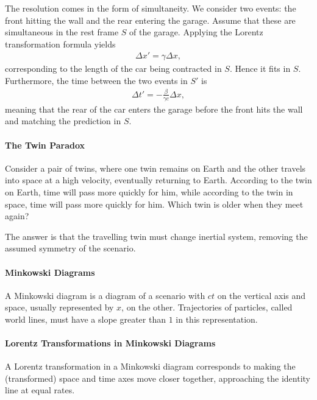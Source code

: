 The resolution comes in the form of simultaneity. We consider two events: the front hitting the wall and the rear entering the garage. Assume that these are simultaneous in the rest frame $S$ of the garage. Applying the Lorentz transformation formula yields
\begin{align*}
	\Delta x' = \gamma\Delta x,
\end{align*}
corresponding to the length of the car being contracted in $S$. Hence it fits in $S$. Furthermore, the time between the two events in $S'$ is
\begin{align*}
	\Delta t' = -\frac{\beta}{\gamma c}\Delta x,
\end{align*}
meaning that the rear of the car enters the garage before the front hits the wall and matching the prediction in $S$.

\paragraph{The Twin Paradox}
Consider a pair of twins, where one twin remains on Earth and the other travels into space at a high velocity, eventually returning to Earth. According to the twin on Earth, time will pass more quickly for him, while according to the twin in space, time will pass more quickly for him. Which twin is older when they meet again?

The answer is that the travelling twin must change inertial system, removing the assumed symmetry of the scenario.

\paragraph{Minkowski Diagrams}
A Minkowski diagram is a diagram of a scenario with $ct$ on the vertical axis and space, usually represented by $x$, on the other. Trajectories of particles, called world lines, must have a slope greater than $1$ in this representation.

\paragraph{Lorentz Transformations in Minkowski Diagrams}
A Lorentz transformation in a Minkowski diagram corresponds to making the (transformed) space and time axes move closer together, approaching the identity line at equal rates.